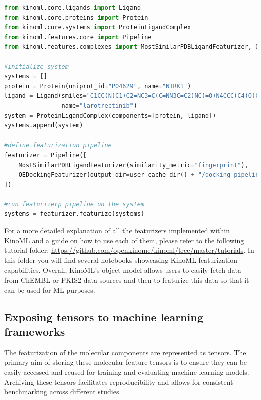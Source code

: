 \documentclass[9pt,lessons]{livecoms}
\begin{document}


\begin{lstlisting}[style=mystyle, language=Python, caption={Code snippet showing how to use the KinoML featurization pipeline to apply several featurizers on a system.}, label=lst:featurizers]
from kinoml.core.ligands import Ligand
from kinoml.core.proteins import Protein
from kinoml.core.systems import ProteinLigandComplex
from kinoml.features.core import Pipeline
from kinoml.features.complexes import MostSimilarPDBLigandFeaturizer, OEDockingFeaturizer

#initialize system
systems = []
protein = Protein(uniprot_id="P04629", name="NTRK1")
ligand = Ligand(smiles="C1CC(N(C1)C2=NC3=C(C=NN3C=C2)NC(=O)N4CCC(C4)O)C5=C(C=CC(=C5)F)F",
                name="larotrectinib")
system = ProteinLigandComplex(components=[protein, ligand])
systems.append(system)

#define featurization pipeline
featurizer = Pipeline([
    MostSimilarPDBLigandFeaturizer(similarity_metric="fingerprint"),
    OEDockingFeaturizer(output_dir=user_cache_dir() + "/docking_pipeline", method="Posit"),
])

#run featurizerp pipeline on the system
systems = featurizer.featurize(systems)

\end{lstlisting}

For a more detailed explanation of all the featurizers implemented within KinoML and a guide on how to use each of them, please refer to the following tutorial folder: \url{https://github.com/openkinome/kinoml/tree/master/tutorials}. In this folder you will find several notebooks showcasing KinoML featurization capabilities. Overall, KinoML's object model allows users to easily fetch data from ChEMBL or PKIS2 data sources and then to featurize this data so that it can be used for ML purposes.


\subsection{Exposing tensors to machine learning frameworks}

The featurization of the molecular components are represented as tensors. The primary aim of storing these molecular feature tensors is to ensure they can be easily accessed and reused for training and evaluating machine learning models. Archiving these tensors facilitates reproducibility and allows for consistent benchmarking across different studies.
\end{document}
